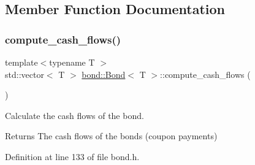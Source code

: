 

\subsection{Member Function Documentation}
\mbox{\label{classbond_1_1_bond_ae15acd8a6acd9674b4fd62796baf6e3c}} 
\subsubsection{\texorpdfstring{compute\+\_\+cash\+\_\+flows()}{compute\_cash\_flows()}}
{\footnotesize\ttfamily template$<$typename T $>$ \\
std\+::vector$<$ T $>$ \hyperlink{classbond_1_1_bond}{bond\+::\+Bond}$<$ T $>$\+::compute\+\_\+cash\+\_\+flows (\begin{DoxyParamCaption}{ }\end{DoxyParamCaption})\hspace{0.3cm}{\ttfamily [private]}}



Calculate the cash flows of the bond. 

\begin{DoxyReturn}{Returns}
The cash flows of the bonds (coupon payments) 
\end{DoxyReturn}


Definition at line 133 of file bond.\+h.


